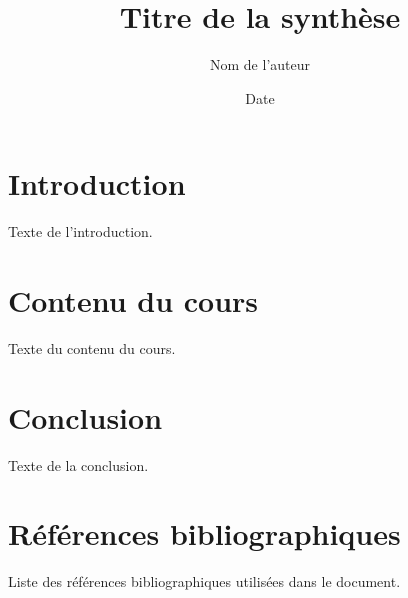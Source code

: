 \documentclass[a4paper, 12pt]{article}
\title{Titre de la synthèse}
\author{Nom de l'auteur}
\date{Date}
\begin{document}
\maketitle

\section{Introduction}

Texte de l'introduction.

\section{Contenu du cours}

Texte du contenu du cours.

\section{Conclusion}

Texte de la conclusion.

\section{Références bibliographiques}

Liste des références bibliographiques utilisées dans le document.
\end{document}
